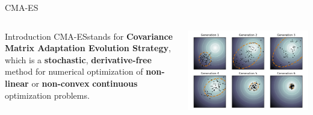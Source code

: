 \documentclass[aspectratio=169]{beamer}
\begin{document}
\begin{frame}{CMA-ES}
\begin{columns}
\hspace{0.2cm}
\begin{block} {Introduction}
\vspace{0.2cm}
CMA-ES\footnotemark stands for \textbf{Covariance Matrix Adaptation Evolution Strategy}, which is a \textbf{stochastic}, \textbf{derivative-free} method for numerical optimization of \textbf{non-linear} or \textbf{non-convex} \textbf{continuous} optimization problems. \\
\vspace{0.2cm}
\end{block}
\centering
\includegraphics[scale=0.5]{img/CMA-ES.png}
    
\end{columns}
\end{frame}

%         
    
\end{document}
